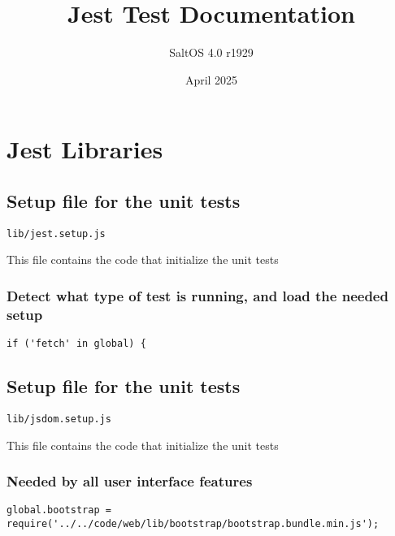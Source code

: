 \documentclass[a4paper]{article}
\title{Jest Test Documentation}
\author{SaltOS 4.0 r1929}
\begin{document}
\date{April 2025}
\maketitle
\clearpage

\tableofcontents
\clearpage


\hypertarget{toc1}{}
\section{Jest Libraries}

\hypertarget{toc2}{}
\subsection{Setup file for the unit tests}

\begin{lstlisting}
lib/jest.setup.js
\end{lstlisting}

This file contains the code that initialize the unit tests

\hypertarget{toc3}{}
\subsubsection{Detect what type of test is running, and load the needed setup}

\begin{lstlisting}
if ('fetch' in global) {
\end{lstlisting}

\hypertarget{toc4}{}
\subsection{Setup file for the unit tests}

\begin{lstlisting}
lib/jsdom.setup.js
\end{lstlisting}

This file contains the code that initialize the unit tests

\hypertarget{toc5}{}
\subsubsection{Needed by all user interface features}

\begin{lstlisting}
global.bootstrap = require('../../code/web/lib/bootstrap/bootstrap.bundle.min.js');
\end{lstlisting}
\end{document}
